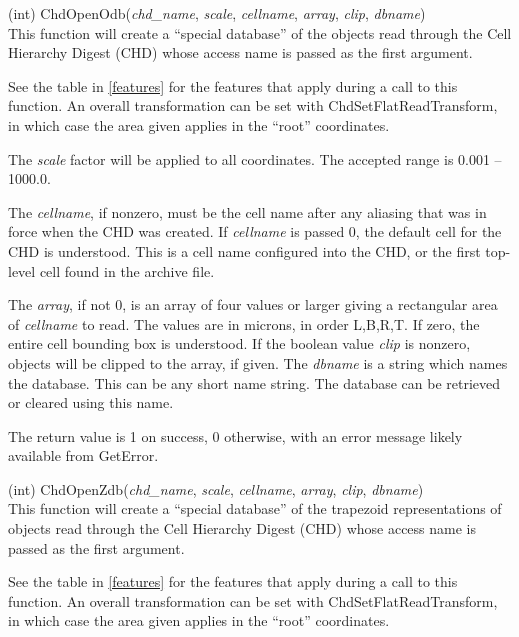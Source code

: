\begin{description}
\item{(int) \vt ChdOpenOdb({\it chd\_name\/}, {\it scale\/}, {\it cellname\/},
  {\it array\/}, {\it clip\/}, {\it dbname})}\\
This function will create a ``special database'' of the objects read
through the Cell Hierarchy Digest (CHD) whose access name is passed as
the first argument.

See the table in \ref{features} for the features that apply during a
call to this function.  An overall transformation can be set with {\vt
ChdSetFlatReadTransform}, in which case the area given applies in the
``root'' coordinates.

The {\it scale} factor will be applied to all coordinates.  The
accepted range is 0.001 -- 1000.0.

The {\it cellname}, if nonzero, must be the cell name after any
aliasing that was in force when the CHD was created.  If {\it
cellname} is passed 0, the default cell for the CHD is understood. 
This is a cell name configured into the CHD, or the first top-level
cell found in the archive file.

The {\it array}, if not 0, is an array of
four values or larger giving a rectangular area of {\it cellname} to
read.  The values are in microns, in order L,B,R,T.  If zero, the
entire cell bounding box is understood.  If the boolean value {\it
clip} is nonzero, objects will be clipped to the array, if given.  The
{\it dbname} is a string which names the database.  This can be any
short name string.  The database can be retrieved or cleared using
this name.

The return value is 1 on success, 0 otherwise, with an error message
likely available from {\vt GetError}.

\item{(int) \vt ChdOpenZdb({\it chd\_name\/}, {\it scale\/}, {\it cellname\/},
  {\it array\/}, {\it clip\/}, {\it dbname})}\\
This function will create a ``special database'' of the trapezoid
representations of objects read through the Cell Hierarchy Digest
(CHD) whose access name is passed as the first argument.

See the table in \ref{features} for the features that apply during a
call to this function.  An overall transformation can be set with {\vt
ChdSetFlatReadTransform}, in which case the area given applies in the
``root'' coordinates.


\end{description}
